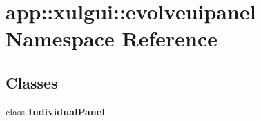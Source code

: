 \section{app::xulgui::evolveuipanel Namespace Reference}
\label{namespaceapp_1_1xulgui_1_1evolveuipanel}


\subsection*{Classes}
\begin{CompactItemize}
\item 
class {\bf IndividualPanel}
\end{CompactItemize}
